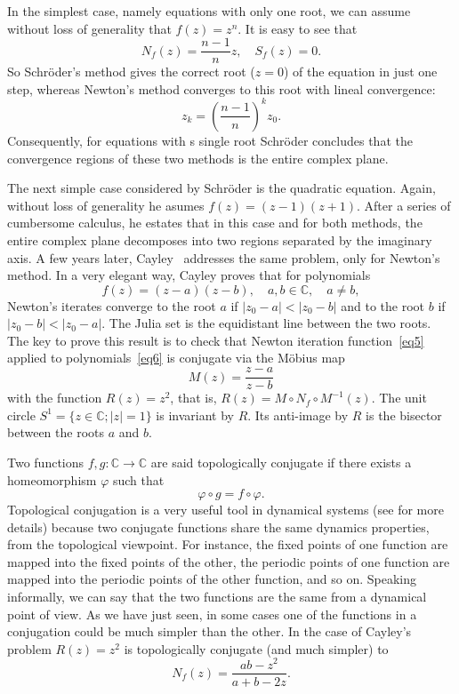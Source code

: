 \documentclass[10pt,a4paper]{article}
\begin{document}
In the simplest case, namely equations with only one root,  we can assume without loss of generality that $f(z)=z^n$. It is easy to see that
$$
N_f(z)=\frac{n-1}{n}z,\quad S_f(z)=0.
$$
So Schr\"oder's method gives the correct root ($z=0$) of the equation in just one step, whereas Newton's method converges to this root with lineal convergence:
$$
z_k=\left(\frac{n-1}{n}\right)^k z_0.
$$
Consequently, for equations with s single root Schr\"oder concludes that the convergence regions of these two methods is the entire complex plane.

The next simple case considered by Schr\"oder is the quadratic equation. Again, without loss of generality he asumes 
$f(z)=(z-1)(z+1)$. After a series of cumbersome calculus, he estates that in this case and for both methods, the entire complex plane decomposes into two regions separated by the imaginary axis. A few years later, Cayley~\cite{Cay} addresses the same problem, only for Newton's method. In a very elegant way, Cayley proves that for polynomials
\begin{equation}\label{eq6}
f(z)=(z-a)(z-b),\quad a,b\in \mathbb{C}, \quad a\ne b,
\end{equation}
Newton's iterates converge to the root $a$ if $|z_0-a|<|z_0-b|$ and to the  root $b$ if $|z_0-b|<|z_0-a|$. The Julia set is the equidistant line between the two roots. The key to prove this result is to check that Newton iteration function~\eqref{eq5} applied to polynomials~\eqref{eq6} is conjugate via the M\"obius map
\begin{equation}\label{eq7}
M(z)=\frac{z-a}{z-b}
\end{equation}
with the function $R(z)=z^2$, that is, $R(z)=M\circ N_f\circ M^{-1}(z)$. The unit circle $S^1=\{z\in\mathbb{C}; |z|=1\}$ is invariant by $R$. Its anti-image by $R$ is the bisector between the roots $a$ and $b$.

Two functions $f,g: \mathbb{C} \to  \mathbb{C} $ are said topologically conjugate if  there exists a homeomorphism $\varphi$ such that 
$$
\varphi\circ g=f\circ \varphi.
$$
Topological conjugation is a very useful tool in dynamical systems (see \cite{Dev} for more details)
because two conjugate functions share the same dynamics properties, from the topological viewpoint. For instance, the fixed points of one function are mapped into the fixed points of the other, the periodic points of one function are mapped into the periodic points of the other function, and so on. Speaking informally, we can say that the two functions are the same from a dynamical point of view. As we have just seen, in some cases one of the functions in a conjugation could be much simpler than the other. In the case of Cayley's problem $R(z)=z^2$ is topologically conjugate (and much simpler) to
$$
N_f(z)=\frac{a b-z^2}{a+b-2 z}.
$$
\end{document}

